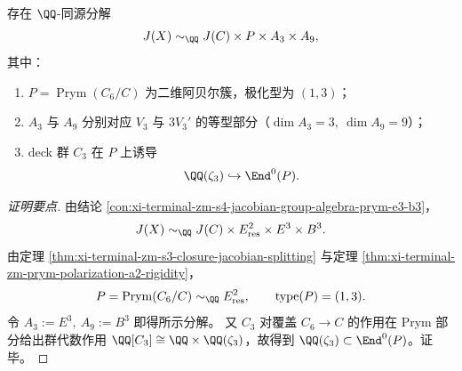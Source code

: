 \begin{conclusion}\label{con:xi-terminal-zm-jacobian-group-algebra-prym13-visible-factor-restated}
存在 \(\QQ\)-同源分解
\[
J(X)\sim_{\QQ}J(C)\times P\times A_3\times A_9,
\]
其中：
\begin{enumerate}
  \item \(P=\operatorname{Prym}(C_6/C)\) 为二维阿贝尔簇，极化型为 \((1,3)\)；
  \item \(A_3\) 与 \(A_9\) 分别对应 \(V_3\) 与 \(3V_3'\) 的等型部分（\(\dim A_3=3,\ \dim A_9=9\)）；
  \item deck 群 \(C_3\) 在 \(P\) 上诱导
  \[
  \QQ(\zeta_3)\hookrightarrow \End^0(P).
  \]
\end{enumerate}
\end{conclusion}
\begin{proof}[证明要点]
由结论 \ref{con:xi-terminal-zm-s4-jacobian-group-algebra-prym-e3-b3}，
\[
J(X)\sim_{\QQ}J(C)\times E_{\mathrm{res}}^2\times E^3\times B^3.
\]
由定理 \ref{thm:xi-terminal-zm-s3-closure-jacobian-splitting} 与定理 \ref{thm:xi-terminal-zm-prym-polarization-a2-rigidity}，
\[
P=\operatorname{Prym}(C_6/C)\sim_{\QQ}E_{\mathrm{res}}^2,\qquad \mathrm{type}(P)=(1,3).
\]
令 \(A_3:=E^3,\ A_9:=B^3\) 即得所示分解。
又 \(C_3\) 对覆盖 \(C_6\to C\) 的作用在 Prym 部分给出群代数作用
\(
\QQ[C_3]\cong \QQ\times\QQ(\zeta_3)
\)，故得到 \(\QQ(\zeta_3)\subset \End^0(P)\)。证毕。
\end{proof}
